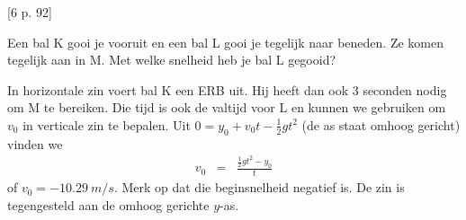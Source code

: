 
\begin{exercise}




[6 p. 92]  
\begin{minipage}[t]{.5\textwidth}
Een bal K gooi je vooruit en een bal L gooi je tegelijk naar beneden. Ze komen tegelijk aan in M. Met welke snelheid heb je bal L gegooid?
\end{minipage}
\hfill
\begin{minipage}[t]{.4\textwidth}
\end{minipage}
\begin{oplossing}
In horizontale zin voert bal K een ERB uit. Hij heeft dan ook 3 seconden nodig om M te bereiken. Die tijd is ook de valtijd voor L en kunnen we gebruiken om $v_0$ in verticale zin te bepalen. Uit $0=y_0+v_0t-\frac{1}{2}gt^2$ (de as staat omhoog gericht) vinden we 
\begin{eqnarray*}
v_0&=&\frac{\frac{1}{2}gt^2-y_0}{t}
\end{eqnarray*}
of $v_0=\SI{-10,29}{m/s}$. Merk op dat die beginsnelheid negatief is. De zin is tegengesteld aan de omhoog gerichte $y$-as.
\end{oplossing}

\end{exercise}
